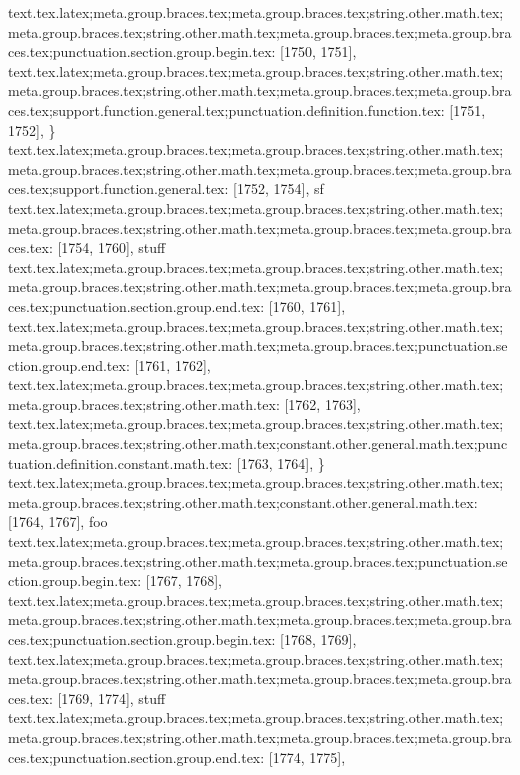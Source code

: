 {{{{{{{{{{{{{{{{{{{{{{{{{{{{{{{{{{{{{{{{{{{{{{{text.tex.latex;meta.group.braces.tex;meta.group.braces.tex;string.other.math.tex;meta.group.braces.tex;string.other.math.tex;meta.group.braces.tex;meta.group.braces.tex;punctuation.section.group.begin.tex: [1750, 1751], {{}
text.tex.latex;meta.group.braces.tex;meta.group.braces.tex;string.other.math.tex;meta.group.braces.tex;string.other.math.tex;meta.group.braces.tex;meta.group.braces.tex;support.function.general.tex;punctuation.definition.function.tex: [1751, 1752], {\}
text.tex.latex;meta.group.braces.tex;meta.group.braces.tex;string.other.math.tex;meta.group.braces.tex;string.other.math.tex;meta.group.braces.tex;meta.group.braces.tex;support.function.general.tex: [1752, 1754], {sf}
text.tex.latex;meta.group.braces.tex;meta.group.braces.tex;string.other.math.tex;meta.group.braces.tex;string.other.math.tex;meta.group.braces.tex;meta.group.braces.tex: [1754, 1760], { stuff}
text.tex.latex;meta.group.braces.tex;meta.group.braces.tex;string.other.math.tex;meta.group.braces.tex;string.other.math.tex;meta.group.braces.tex;meta.group.braces.tex;punctuation.section.group.end.tex: [1760, 1761], {}}
text.tex.latex;meta.group.braces.tex;meta.group.braces.tex;string.other.math.tex;meta.group.braces.tex;string.other.math.tex;meta.group.braces.tex;punctuation.section.group.end.tex: [1761, 1762], {}}
text.tex.latex;meta.group.braces.tex;meta.group.braces.tex;string.other.math.tex;meta.group.braces.tex;string.other.math.tex: [1762, 1763], {
}
text.tex.latex;meta.group.braces.tex;meta.group.braces.tex;string.other.math.tex;meta.group.braces.tex;string.other.math.tex;constant.other.general.math.tex;punctuation.definition.constant.math.tex: [1763, 1764], {\}
text.tex.latex;meta.group.braces.tex;meta.group.braces.tex;string.other.math.tex;meta.group.braces.tex;string.other.math.tex;constant.other.general.math.tex: [1764, 1767], {foo}
text.tex.latex;meta.group.braces.tex;meta.group.braces.tex;string.other.math.tex;meta.group.braces.tex;string.other.math.tex;meta.group.braces.tex;punctuation.section.group.begin.tex: [1767, 1768], {{}
text.tex.latex;meta.group.braces.tex;meta.group.braces.tex;string.other.math.tex;meta.group.braces.tex;string.other.math.tex;meta.group.braces.tex;meta.group.braces.tex;punctuation.section.group.begin.tex: [1768, 1769], {{}
text.tex.latex;meta.group.braces.tex;meta.group.braces.tex;string.other.math.tex;meta.group.braces.tex;string.other.math.tex;meta.group.braces.tex;meta.group.braces.tex: [1769, 1774], {stuff}
text.tex.latex;meta.group.braces.tex;meta.group.braces.tex;string.other.math.tex;meta.group.braces.tex;string.other.math.tex;meta.group.braces.tex;meta.group.braces.tex;punctuation.section.group.end.tex: [1774, 1775], {}}
}}}}}}}}}}}}}}}}}}}}}}}}}}}}}}}}}}}}}}}}}}}}}}}}}
